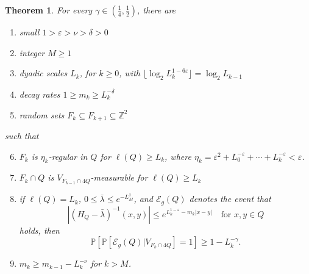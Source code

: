 \documentclass{amsart}
\newtheorem{theorem}[equation]{Theorem}
\numberwithin{equation}{section}
\numberwithin{figure}{section}
\newcommand{\Z}{\mathbb{Z}}
\renewcommand{\P}{\mathbb{P}}
\newcommand{\ep}{\varepsilon}
\begin{document}
\begin{theorem}
\label{l.main2}
For every $\gamma \in (\tfrac14,\tfrac12)$, there are
\begin{enumerate}
\item small $1 > \ep > \nu > \delta > 0$
\item integer $M \geq 1$
\item dyadic scales $L_k$, for $k \geq 0$, with $\lfloor \log_2 L_k^{1-6\ep} \rfloor = \log_2 L_{k-1}$
\item decay rates $1 \geq m_k \geq L_k^{-\delta}$
\item random sets $F_k \subseteq F_{k+1} \subseteq \Z^2$
\end{enumerate}
such that
\begin{enumerate}
\setcounter{enumi}{5}
\item $F_k$ is $\eta_k$-regular in $Q$ for $\ell(Q) \geq L_k$, where $\eta_k = \ep^2 + L_0^{-\ep} + \cdots + L_k^{-\ep} < \ep$.
\item $F_k \cap Q$ is $V_{F_{k-1} \cap 4Q}$-measurable for $\ell(Q) \geq L_k$
\item if $\ell(Q) = L_k$, $0 \leq \bar \lambda \leq e^{-L_M^\delta}$, and $\mathcal E_g(Q)$ denotes the event that
\begin{equation*}
|(H_Q - \bar \lambda)^{-1}(x,y)| \leq e^{L_k^{1-\ep} - m_k |x-y|} \quad \mbox{for } x, y \in Q
\end{equation*}
holds, then
\begin{equation*}
\P[\P[\mathcal E_g(Q) | V_{F_k \cap 4Q}] = 1] \geq 1 - L_k^{-\gamma}.
\end{equation*}
\item $m_k \geq m_{k-1} - L_k^{-\nu}$ for $k > M$.
\end{enumerate}
\end{theorem}
\end{document}
